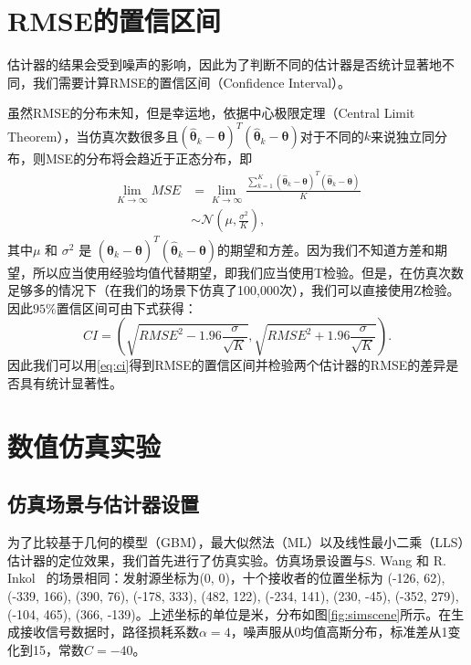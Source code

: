 \section{RMSE的置信区间}

估计器的结果会受到噪声的影响，因此为了判断不同的估计器是否统计显著地不同，我们需要计算RMSE的置信区间（Confidence Interval）。

虽然RMSE的分布未知，但是幸运地，依据中心极限定理（Central Limit Theorem），当仿真次数很多且$({\widehat{\bm{\theta}}_k - \bm{\theta}})^T({\widehat{\bm{\theta}}_k - \bm{\theta}})$对于不同的$k$来说独立同分布，则MSE的分布将会趋近于正态分布，即
\begin{equation}
\begin{split}
\mathop{\mathrm{lim}}\limits_{K\rightarrow\infty}MSE &= \mathop{\mathrm{lim}}\limits_{K\rightarrow\infty} \frac{\sum\limits_{k=1}^K({\widehat{\bm{\theta}}_k - \bm{\theta}})^T({\widehat{\bm{\theta}}_k - \bm{\theta}})}{K} \\
&\sim \mathcal{N}(\mu, \frac{\sigma^2}{K}),
\end{split}
\end{equation}
其中$\mu$ 和 ${\sigma}^2$ 是 $({\widehat{\bm{\theta}}_k - \bm{\theta}})^T({\widehat{\bm{\theta}}_k - \bm{\theta}})$的期望和方差。因为我们不知道方差和期望，所以应当使用经验均值代替期望，即我们应当使用T检验。但是，在仿真次数足够多的情况下（在我们的场景下仿真了100,000次），我们可以直接使用Z检验。因此$95\%$置信区间可由下式获得：
\begin{equation}
CI = (\sqrt{RMSE^2 - 1.96\frac{\sigma}{\sqrt{K}}}, \sqrt{RMSE^2 + 1.96\frac{\sigma}{\sqrt{K}}}). \label{eq:ci}
\end{equation}
因此我们可以用\eqref{eq:ci}得到RMSE的置信区间并检验两个估计器的RMSE的差异是否具有统计显著性。

\section{数值仿真实验}

\subsection{仿真场景与估计器设置}

为了比较基于几何的模型（GBM），最大似然法（ML）以及线性最小二乘（LLS）估计器的定位效果，我们首先进行了仿真实验。仿真场景设置与S. Wang 和 R. Inkol~\cite{wang2011near} 的场景相同：发射源坐标为(0, 0)，十个接收者的位置坐标为 (-126, 62), (-339, 166), (390, 76), (-178, 333), (482, 122), (-234, 141), (230, -45), (-352, 279), (-104, 465), (366, -139)。上述坐标的单位是米，分布如图\ref{fig:simscene}所示。在生成接收信号数据时，路径损耗系数$\alpha=4$，噪声服从0均值高斯分布，标准差从1变化到15，常数$C=-40$。

